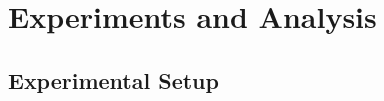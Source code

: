 \documentclass[journal]{IEEEtran}
\begin{document}


\section{Experiments and Analysis}

\subsection{Experimental Setup}
\end{document}
